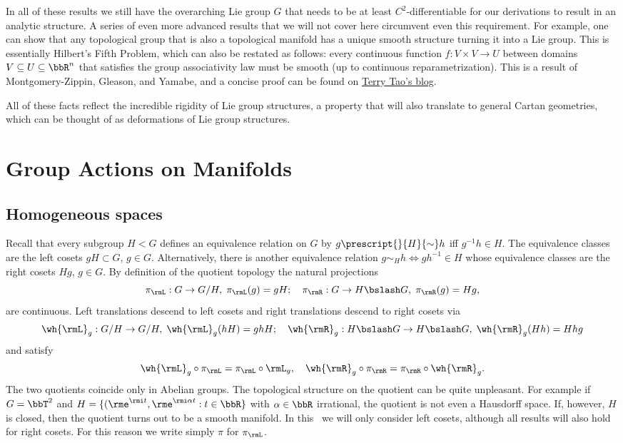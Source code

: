 \begin{rem}
    In all of these results we still have the overarching Lie group $G$ that needs to be at least $C^2$-differentiable for our derivations to result in an analytic structure. A series of even more advanced results that we will not cover here circumvent even this requirement. For example, one can show that any topological group that is also a topological manifold has a unique smooth structure turning it into a Lie group. This is essentially Hilbert's Fifth Problem, which can also be restated as follows: every continuous function $f:V\times V\to U$ between domains $V\subseteq U\subseteq \bbR^n$ that satisfies the group associativity law must be smooth (up to continuous reparametrization). This is a result of Montgomery-Zippin, Gleason, and Yamabe, and a concise proof can be found on \href{https://terrytao.wordpress.com/2011/06/17/hilberts-fifth-problem-and-gleason-metrics/}{Terry Tao's blog}.
\end{rem}

All of these facts reflect the incredible rigidity of Lie group structures, a property that will also translate to general Cartan geometries, which can be thought of as deformations of Lie group structures.








\clearpage
\chapter{Group Actions on Manifolds}\label{ch group actions}


\section{Homogeneous spaces}\label{sec: homogeneous spaces}

Recall that every subgroup  $H<G$ defines an equivalence relation on $G$ by $g\prescript{}{H}{\sim}h$ iff $g^{-1}h\in H$. The equivalence classes are the left cosets $gH\subset G$, $g\in G$. Alternatively, there is another equivalence relation $g\sim_H h\Leftrightarrow gh^{-1}\in H$ whose equivalence classes are the right cosets $Hg$, $g\in G$.  By definition of the quotient topology the natural projections
\[\pi_\rmL:G\to G\slash H,\;\pi_\rmL(g)=gH;\quad \pi_\rmR:G\to H\bslash G,\;\pi_\rmR(g)=Hg,\]
are continuous. Left translations descend to left cosets and right translations descend to right cosets via
\[\wh{\rmL}_g:G\slash H\to G\slash H,\; \wh{\rmL}_g(hH)=ghH;\quad \wh{\rmR}_g: H\bslash G\to H\bslash G,\; \wh{\rmR}_g(Hh)=Hhg\]
and satisfy
\[\wh{\rmL}_g\circ \pi_\rmL=\pi_\rmL\circ \rmL_g,\quad \wh{\rmR}_g\circ \pi_\rmR=\pi_\rmR\circ \wh{\rmR}_g.\]
The two quotients coincide only in Abelian groups. The topological structure on the quotient can be quite unpleasant. For example if $G=\bbT^2$ and $H=\{(\rme^{\rmi t},\rme^{\rmi\alpha t}:t\in \bbR\}$ with $\alpha \in\bbR$ irrational, the quotient is not even a Hausdorff space. If, however, $H$ is closed, then the quotient turns out to be a smooth manifold. In this \sect\ we will only consider left cosets, although all results will also hold for right cosets. For this reason we write simply $\pi$ for $\pi_\rmL$.

